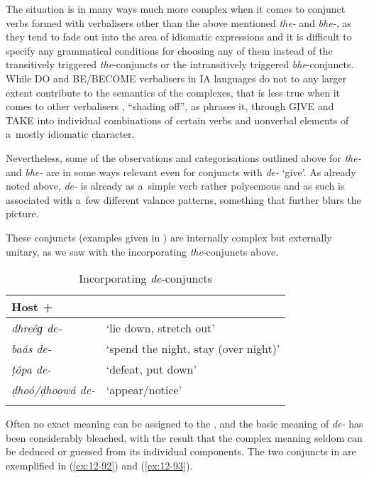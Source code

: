 The situation is in many ways much more complex when it comes to conjunct verbs formed with
verbalisers other than the above mentioned \textit{the-} and \textit{bhe-}, as they tend to fade out
into the area of idiomatic expressions and it is difficult to specify any grammatical conditions for
choosing any of them instead of the transitively triggered \textit{the}-conjuncts or the
intransitively triggered \textit{bhe}-conjuncts. While DO and BE/BECOME verbalisers in IA
languages do not to any larger extent contribute to the semantics of the complexes, that is less
true when it comes to other verbalisers \citep[78--79]{gambhir1993}, ``shading off'', as
\citet[157]{masica1993} phrases it, through GIVE and TAKE into individual combinations of certain
verbs and nonverbal elements of a~mostly idiomatic character.



Nevertheless, some of the observations and categorisations outlined above for \textit{the-} and \textit{bhe-} are in some ways relevant even for conjuncts with \textit{de-} `give'. As already noted above, \textit{de-} is already as a~simple verb rather polysemous and as such is associated with a~few different valance patterns, something that further blurs the picture.

\largerpage
{} These conjuncts (examples given in ) are internally complex but externally unitary, as we saw with the incorporating \textit{the}-conjuncts above. 


\begin{table}[ht]
\caption{Incorporating \textit{de}-conjuncts}
\begin{tabularx}{.75\textwidth}{ l@{\hspace{45pt}} Q }
\lsptoprule
Host +  &
\\\midrule
\textit{dhreéɡ de-} &
`lie down, stretch out'\\
\textit{baás de-} &
`spend the night, stay (over night)'\\
\textit{ṭópa de-} &
`defeat, put down'\\
\textit{ḍhoó/ḍhoowá de-} &
`appear/notice'\\\lspbottomrule
\end{tabularx}
\label{tab:12-7}
\end{table}


Often no exact meaning can be assigned to the , and the basic meaning of \textit{de-} has been considerably bleached, with the result that the complex meaning seldom can be deduced or guessed from its individual components. The two conjuncts in  are exemplified in (\ref{ex:12-92}) and (\ref{ex:12-93}).

